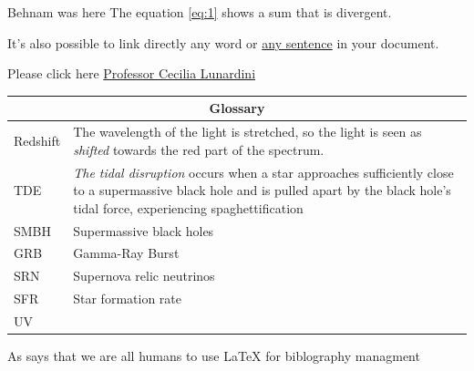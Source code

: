 \documentclass[fleqn]{article}
\begin{document}
  Behnam was here The equation \ref{eq:1} shows a sum that is divergent.

  It's also possible to link directly any word or \hyperlink{}{any sentence} in your document.

  Please click here \href{https://www.physics.wisc.edu/directory/halzen-francis-l/}{Professor Cecilia Lunardini}


  \clearpage

  \begin{tabular}{ |p{2cm}|p{9cm}|  }
    \hline
    \multicolumn{2}{|c|}{Glossary} \\
    \hline
      Redshift & The wavelength of the light is stretched, so the light is seen as \emph{shifted} 
      towards the red part of the spectrum.
      \\
      TDE & \emph{The tidal disruption} occurs when a star approaches sufficiently close to a supermassive 
      black hole and is pulled apart by the black hole's tidal force, experiencing spaghettification 
      \\
      SMBH & Supermassive black holes  
      \\
      GRB & Gamma-Ray Burst
      \\
      SRN & Supernova relic neutrinos
      \\
      SFR & Star formation rate
      \\
      UV
      \\
    \hline
  \end{tabular}


  \pagebreak



  As \textcite{testt} says that we are all humans to use \LaTeX{} for biblography managment

  \printbibliography
  
\end{document}
